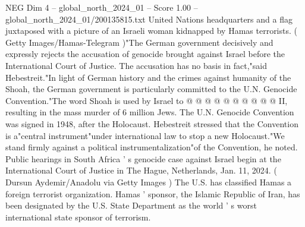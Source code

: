 \begin{textsample}{NEG Dim 4 – global\_north\_2024\_01 – Score 1.00 – global\_north\_2024\_01/200135815.txt}
United Nations headquarters and a flag juxtaposed with a picture of an Israeli woman kidnapped by Hamas terrorists. ( Getty Images/Hamas-Telegram )"The German government decisively and expressly rejects the accusation of genocide brought against Israel before the International Court of Justice.
The accusation has no basis in fact,"said Hebestreit."In light of German history and the crimes against humanity of the Shoah, the German government is particularly committed to the U.N.
Genocide Convention."The word Shoah is used by Israel to @ @ @ @ @ @ @ @ @ @ II, resulting in the mass murder of 6 million Jews.
The U.N.
Genocide Convention was signed in 1948, after the Holocaust.
Hebestreit stressed that the Convention is a"central instrument"under international law to stop a new Holocaust."We stand firmly against a political instrumentalization"of the Convention, he noted.
Public hearings in South Africa ' s genocide case against Israel begin at the International Court of Justice in The Hague, Netherlands, Jan. 11, 2024. ( Dursun Aydemir/Anadolu via Getty Images ) The U.S. has classified Hamas a foreign terrorist organization.
Hamas ' sponsor, the Islamic Republic of Iran, has been designated by the U.S.
State Department as the world ' s worst international state sponsor of terrorism.

\end{textsample}
